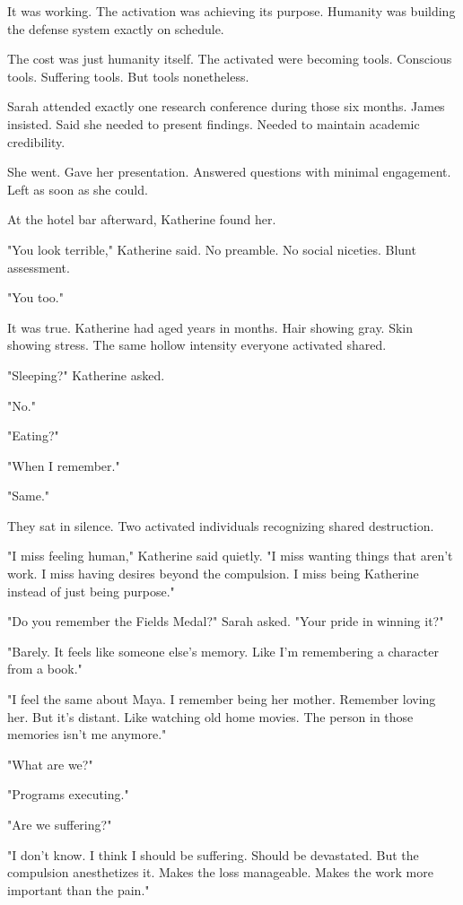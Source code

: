 It was working. The activation was achieving its purpose. Humanity was building the defense system exactly on schedule.

The cost was just humanity itself. The activated were becoming tools. Conscious tools. Suffering tools. But tools nonetheless.

\scenebreak

Sarah attended exactly one research conference during those six months. James insisted. Said she needed to present findings. Needed to maintain academic credibility.

She went. Gave her presentation. Answered questions with minimal engagement. Left as soon as she could.

At the hotel bar afterward, Katherine found her.

"You look terrible," Katherine said. No preamble. No social niceties. Blunt assessment.

"You too."

It was true. Katherine had aged years in months. Hair showing gray. Skin showing stress. The same hollow intensity everyone activated shared.

"Sleeping?" Katherine asked.

"No."

"Eating?"

"When I remember."

"Same."

They sat in silence. Two activated individuals recognizing shared destruction.

"I miss feeling human," Katherine said quietly. "I miss wanting things that aren't work. I miss having desires beyond the compulsion. I miss being Katherine instead of just being purpose."

"Do you remember the Fields Medal?" Sarah asked. "Your pride in winning it?"

"Barely. It feels like someone else's memory. Like I'm remembering a character from a book."

"I feel the same about Maya. I remember being her mother. Remember loving her. But it's distant. Like watching old home movies. The person in those memories isn't me anymore."

"What are we?"

"Programs executing."

"Are we suffering?"

"I don't know. I think I should be suffering. Should be devastated. But the compulsion anesthetizes it. Makes the loss manageable. Makes the work more important than the pain."

